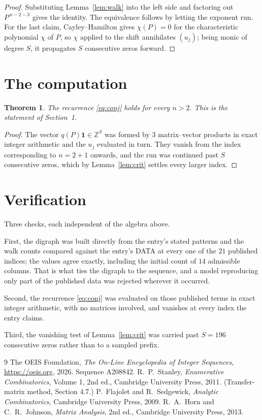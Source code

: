 \documentclass[11pt,a4paper]{article}
\theoremstyle{plain}
\newtheorem{theorem}{Theorem}
\theoremstyle{definition}
\begin{document}
\begin{proof}
Substituting Lemma~\ref{lem:walk} into the left side and factoring out
$P^{\,n-2-3}$ gives the identity. The equivalence follows by letting the exponent
run. For the last claim, Cayley--Hamilton gives $\chi(P)=0$ for the characteristic
polynomial $\chi$ of $P$, so $\chi$ applied to the shift annihilates $(u_j)$; being monic of
degree $S$, it propagates $S$ consecutive zeros forward.
\end{proof}

\section{The computation}

\begin{theorem}
The recurrence \eqref{eq:conj} holds for every $n>2$. This is the statement of
Section~1.
\end{theorem}

\begin{proof}
The vector $q(P)\mathbf{1}\in\mathbb{Z}^{S}$ was formed by $3$ matrix--vector
products in exact integer arithmetic and the $u_j$ evaluated in turn. They vanish from the
index corresponding to $n=2+1$ onwards, and the run was continued past $S$ consecutive
zeros, which by Lemma~\ref{lem:crit} settles every larger index.
\end{proof}

\section{Verification}

Three checks, each independent of the algebra above.

First, the digraph was built directly from the entry's stated patterns and the walk counts
compared against the entry's DATA at every one of the $21$ published indices; the
values agree exactly, including the initial count of $14$ admissible columns. That is
what ties the digraph to the sequence, and a model reproducing only part of the published
data was rejected wherever it occurred.

Second, the recurrence \eqref{eq:conj} was evaluated on those published terms in exact
integer arithmetic, with no matrices involved, and vanishes at every index the entry claims.

Third, the vanishing test of Lemma~\ref{lem:crit} was carried past $S=196$ consecutive
zeros rather than to a sampled prefix.

\begin{thebibliography}{9}
 The OEIS Foundation, \emph{The On-Line Encyclopedia of Integer
Sequences}, \url{https://oeis.org}, 2026. Sequence A208842.
 R.~P.~Stanley, \emph{Enumerative Combinatorics}, Volume 1, 2nd ed.,
Cambridge University Press, 2011. (Transfer-matrix method, Section 4.7.)
 P.~Flajolet and R.~Sedgewick, \emph{Analytic Combinatorics}, Cambridge
University Press, 2009.
 R.~A.~Horn and C.~R.~Johnson, \emph{Matrix Analysis}, 2nd ed., Cambridge
University Press, 2013.
\end{thebibliography}
\end{document}
